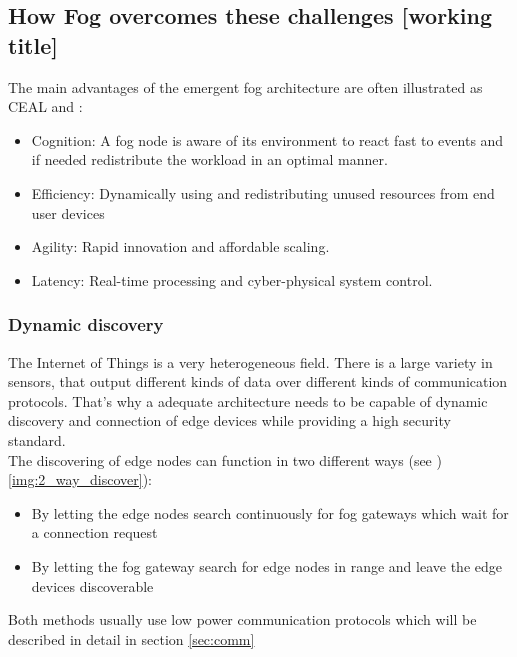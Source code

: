 \subsection{How Fog overcomes these challenges [working title]}\label{sec:fog_challenges}

The main advantages of the emergent fog architecture are often illustrated as CEAL \cite[p. 858]{DBLP:journals/iotj/ChiangZ16} and \cite[p. 7]{OpenFog}:

\begin{itemize}
	\item Cognition: A fog node is aware of its environment to react fast to events and if needed redistribute the workload in an optimal manner.
	\item Efficiency: Dynamically using and redistributing unused resources from end user devices
	\item Agility: Rapid innovation and affordable scaling.
	\item Latency: Real-time processing and cyber-physical system control.
\end{itemize}

\subsubsection{Dynamic discovery}
The Internet of Things is a very heterogeneous field. There is a large variety in sensors, that output  different kinds of data over different kinds of communication protocols. That's why a adequate architecture needs to be capable of dynamic discovery and connection of edge devices while providing a high security standard.\\
The discovering of edge nodes can function in two different ways (see )\autoref{img:2_way_discover}):
\begin{itemize}
	\item By letting the edge nodes search continuously for fog gateways which wait for a connection request
	\item By letting the fog gateway search for edge nodes in range and leave the edge devices discoverable
\end{itemize}


Both methods usually use low power communication protocols which will be described in detail in section \ref{sec:comm}

